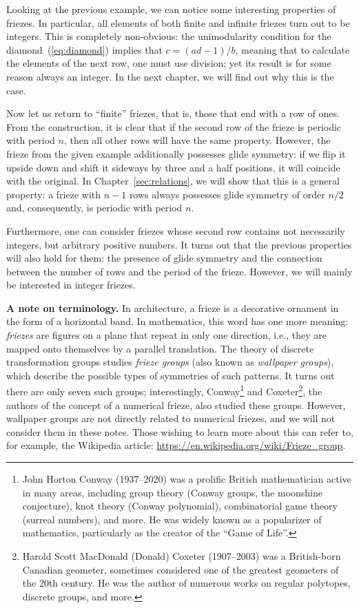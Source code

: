 \documentclass[a4paper,11pt]{amsart}
\theoremstyle{plain}
\theoremstyle{remark}
\theoremstyle{definition}
\numberwithin{equation}{section}
\numberwithin{figure}{section}
\begin{document}
Looking at the previous example, we can notice some interesting properties of friezes. In particular, all elements of both finite and infinite friezes turn out to be integers. This is completely non-obvious: the unimodularity condition for the diamond~(\ref{eq:diamond}) implies that $c = (ad-1)/b$, meaning that to calculate the elements of the next row, one must use division; yet its result is  for some reason always an integer. In the next chapter, we will find out why this is the case.

Now let us return to ``finite'' friezes, that  is, those that end with a row of ones. From the construction, it is clear that if the second row of the frieze is periodic with period $n$, then all other rows will have the same property. However, the frieze from the given example additionally possesses glide symmetry: if we flip it upside down and shift it sideways by three and a half positions, it will coincide with the original. In Chapter~\ref{sec:relations}, we will show that this is a general property: a frieze with $n-1$ rows always possesses glide symmetry of order $n/2$ and, consequently, is periodic with period $n$.

Furthermore, one can consider friezes whose second row contains not necessarily integers, but arbitrary positive numbers. It turns out that the previous properties will also hold for them: the presence of glide symmetry and the connection between the number of rows and the period of the frieze. However, we will mainly be interested in integer friezes.

\textbf{A note on terminology.} In architecture, a frieze is a decorative ornament in the form of a horizontal band. In mathematics, this word has one more meaning: \emph{friezes}  are figures on a plane that repeat in only one direction, i.e., they are mapped onto themselves by a parallel translation. The theory of discrete transformation groups studies \emph{frieze groups} (also known as \emph{wallpaper groups}), which describe the possible types of symmetries of such patterns. It turns out there are only seven such groups; interestingly, Conway\footnote{John Horton Conway (1937--2020) was a prolific British mathematician active in many areas, including group theory (Conway groups, the moonshine conjecture), knot theory (Conway polynomial), combinatorial game theory (surreal numbers), and more. He was widely known as a popularizer of mathematics, particularly as the creator of the ``Game of Life''. } and Coxeter\footnote{Harold Scott MacDonald (Donald) Coxeter (1907--2003) was a British-born Canadian geometer, sometimes considered  one of the greatest geometers of the 20th century. He was the author of numerous works on regular polytopes, discrete groups, and more.}, the authors of the concept of a numerical frieze, also studied these groups. However, wallpaper groups are not directly related to numerical friezes, and we will not consider them in these notes. Those wishing to learn more about this can refer to, for example, the Wikipedia article: \url{https://en.wikipedia.org/wiki/Frieze_group}.
\end{document}
